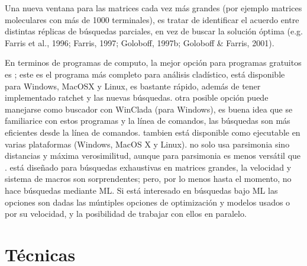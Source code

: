Una nueva ventana para las matrices cada vez m\'as grandes (por ejemplo matrices moleculares con m\'as de 1000 terminales),  es tratar de identificar el acuerdo entre distintas r\'eplicas de b\'usquedas parciales,  en vez de buscar la soluci\'on \'optima {\color{red}(e.g. Farris et al.,  1996; Farris,  1997; Goloboff,  1997b; Goloboff \& Farris,  2001)}. 

En terminos de programas de computo,  la mejor opci\'on para programas gratuitos es ; este es el programa m\'as  completo para an\'alisis clad\'istico, est\'a disponible para Windows, MacOSX y Linux, es bastante r\'apido, adem\'as de tener implementado ratchet y las nuevas b\'usquedas.   otra posible opci\'on puede manejarse como buscador con WinClada (para Windows),  es buena idea que se familiarice con estos programas y la l\'inea de comandos, las b\'usquedas son m\'as eficientes desde la l\'inea de comandos.   tambien est\'a disponible como ejecutable en varias plataformas (Windows, MacOS X y Linux).    no solo usa parsimonia sino distancias y m\'axima verosimilitud, aunque para parsimonia es menos vers\'atil que .   est\'a dise\~nado para b\'usquedas exhaustivas en matrices grandes, la velocidad y sistema de macros son sorprendentes; pero, por lo menos hasta el momento, no hace b\'usquedas mediante ML. Si est\'a interesado en b\'usquedas bajo ML las opciones son  dadas las m\'untiples opciones de optimizaci\'on y modelos usados o  por su velocidad, y la posibilidad de trabajar con ellos en paralelo.


\section*{T\'ecnicas}

